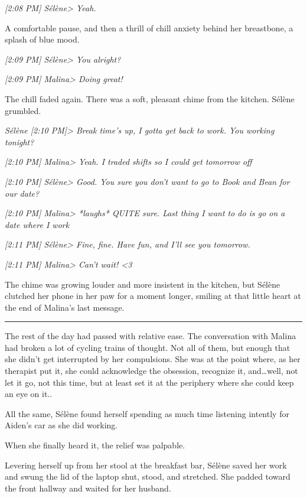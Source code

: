 \emph{{[}2:08 PM{]} Sélène\textgreater{} Yeah.}

A comfortable pause, and then a thrill of chill anxiety behind her breastbone, a splash of blue mood.

\emph{{[}2:09 PM{]} Sélène\textgreater{} You alright?}

\emph{{[}2:09 PM{]} Malina\textgreater{} Doing great!}

The chill faded again. There was a soft, pleasant chime from the kitchen. Sélène grumbled.

\emph{Sélène {[}2:10 PM{]}\textgreater{} Break time's up, I gotta get back to work. You working tonight?}

\emph{{[}2:10 PM{]} Malina\textgreater{} Yeah. I traded shifts so I could get tomorrow off}

\emph{{[}2:10 PM{]} Sélène\textgreater{} Good. You sure you don't want to go to Book and Bean for our date?}

\emph{{[}2:10 PM{]} Malina\textgreater{} *laughs* QUITE sure. Last thing I want to do is go on a date where I work}

\emph{{[}2:11 PM{]} Sélène\textgreater{} Fine, fine. Have fun, and I'll see you tomorrow.}

\emph{{[}2:11 PM{]} Malina\textgreater{} Can't wait! \textless{}3}

The chime was growing louder and more insistent in the kitchen, but Sélène clutched her phone in her paw for a moment longer, smiling at that little heart at the end of Malina's last message.

\begin{center}\rule{0.5\linewidth}{\linethickness}\end{center}

The rest of the day had passed with relative ease. The conversation with Malina had broken a lot of cycling trains of thought. Not all of them, but enough that she didn't get interrupted by her compulsions. She was at the point where, as her therapist put it, she could acknowledge the obsession, recognize it, and\ldots{}well, not let it go, not this time, but at least set it at the periphery where she could keep an eye on it..

All the same, Sélène found herself spending as much time listening intently for Aiden's car as she did working.

When she finally heard it, the relief was palpable.

Levering herself up from her stool at the breakfast bar, Sélène saved her work and swung the lid of the laptop shut, stood, and stretched. She padded toward the front hallway and waited for her husband.

